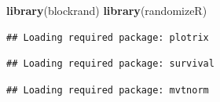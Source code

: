 \documentclass[
]{article}
\newenvironment{Shaded}{\begin{snugshade}}{\end{snugshade}}
\newcommand{\FunctionTok}[1]{\textcolor[rgb]{0.13,0.29,0.53}{\textbf{#1}}}
\newcommand{\NormalTok}[1]{#1}
\begin{document}
\begin{Shaded}
\begin{Highlighting}[]
\FunctionTok{library}\NormalTok{(blockrand)}
\FunctionTok{library}\NormalTok{(randomizeR)}
\end{Highlighting}
\end{Shaded}

\begin{verbatim}
## Loading required package: plotrix
\end{verbatim}

\begin{verbatim}
## Loading required package: survival
\end{verbatim}

\begin{verbatim}
## Loading required package: mvtnorm
\end{verbatim}
\end{document}
